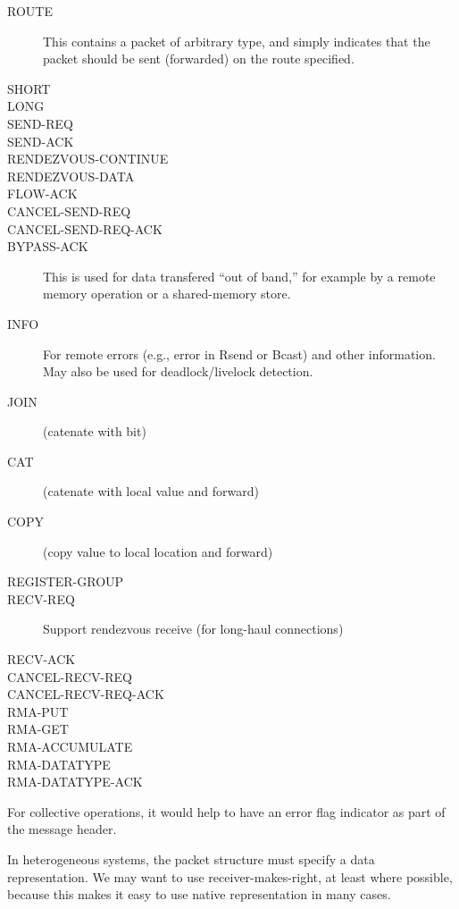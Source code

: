 \documentclass{article}
\begin{document}
\begin{description}
\item[ROUTE]This contains a packet of arbitrary type, and simply indicates
  that the packet should be sent (forwarded) on the route specified.
\item[SHORT]
\item[LONG]
\item[SEND-REQ]
\item[SEND-ACK]
\item[RENDEZVOUS-CONTINUE]
\item[RENDEZVOUS-DATA]
\item[FLOW-ACK]
\item[CANCEL-SEND-REQ]
\item[CANCEL-SEND-REQ-ACK]
\item[BYPASS-ACK]This is used for data transfered ``out of band,'' for example
  by a remote memory operation or a shared-memory store.
\item[INFO]For remote errors (e.g., error in Rsend or Bcast) and other
  information.  May also be used for deadlock/livelock detection.

\item[JOIN](catenate with bit)
\item[CAT](catenate with local value and forward)
\item[COPY](copy value to local location and forward)
\item[REGISTER-GROUP]

\item[RECV-REQ]Support rendezvous receive (for long-haul connections)
\item[RECV-ACK]
\item[CANCEL-RECV-REQ]
\item[CANCEL-RECV-REQ-ACK]

\item[RMA-PUT]
\item[RMA-GET]
\item[RMA-ACCUMULATE]
\item[RMA-DATATYPE]
\item[RMA-DATATYPE-ACK]
\end{description}

For collective operations, it would help to have an error flag indicator as
part of the message header.

In heterogeneous systems, the packet structure must specify a data
representation.  We may want to use receiver-makes-right, at least where
possible, because this makes it easy to use native representation in many
cases.  
\end{document}
